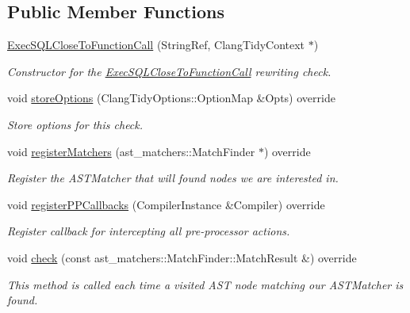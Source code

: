 \subsection*{Public Member Functions}
\begin{DoxyCompactItemize}
\item 
\hyperlink{classclang_1_1tidy_1_1pagesjaunes_1_1_exec_s_q_l_close_to_function_call_aba6dcb92a554c560136ecd20adc9bc53}{Exec\+S\+Q\+L\+Close\+To\+Function\+Call} (String\+Ref, Clang\+Tidy\+Context $\ast$)
\begin{DoxyCompactList}\small\item\em Constructor for the \hyperlink{classclang_1_1tidy_1_1pagesjaunes_1_1_exec_s_q_l_close_to_function_call}{Exec\+S\+Q\+L\+Close\+To\+Function\+Call} rewriting check. \end{DoxyCompactList}\item 
void \hyperlink{classclang_1_1tidy_1_1pagesjaunes_1_1_exec_s_q_l_close_to_function_call_aea11c59499af73db355026396b009ad2}{store\+Options} (Clang\+Tidy\+Options\+::\+Option\+Map \&Opts) override
\begin{DoxyCompactList}\small\item\em Store options for this check. \end{DoxyCompactList}\item 
void \hyperlink{classclang_1_1tidy_1_1pagesjaunes_1_1_exec_s_q_l_close_to_function_call_a574828312647b46fa645609f41787d35}{register\+Matchers} (ast\+\_\+matchers\+::\+Match\+Finder $\ast$) override
\begin{DoxyCompactList}\small\item\em Register the A\+S\+T\+Matcher that will found nodes we are interested in. \end{DoxyCompactList}\item 
void \hyperlink{classclang_1_1tidy_1_1pagesjaunes_1_1_exec_s_q_l_close_to_function_call_a3d8238ee00e0c6ab1bfc0e9d486f8627}{register\+P\+P\+Callbacks} (Compiler\+Instance \&Compiler) override
\begin{DoxyCompactList}\small\item\em Register callback for intercepting all pre-\/processor actions. \end{DoxyCompactList}\item 
void \hyperlink{classclang_1_1tidy_1_1pagesjaunes_1_1_exec_s_q_l_close_to_function_call_a1906033d14542dee9278065f2d7daa6a}{check} (const ast\+\_\+matchers\+::\+Match\+Finder\+::\+Match\+Result \&) override
\begin{DoxyCompactList}\small\item\em This method is called each time a visited A\+ST node matching our A\+S\+T\+Matcher is found. \end{DoxyCompactList}\item 

\end{DoxyCompactItemize}
